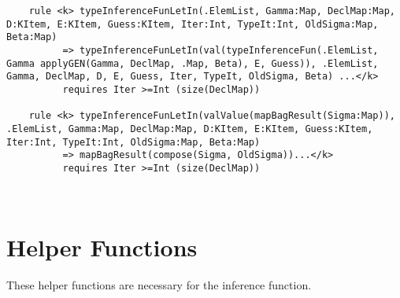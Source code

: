 \begin{lstlisting}
    rule <k> typeInferenceFunLetIn(.ElemList, Gamma:Map, DeclMap:Map, D:KItem, E:KItem, Guess:KItem, Iter:Int, TypeIt:Int, OldSigma:Map, Beta:Map)
          => typeInferenceFunLetIn(val(typeInferenceFun(.ElemList, Gamma applyGEN(Gamma, DeclMap, .Map, Beta), E, Guess)), .ElemList, Gamma, DeclMap, D, E, Guess, Iter, TypeIt, OldSigma, Beta) ...</k>
          requires Iter >=Int (size(DeclMap))

    rule <k> typeInferenceFunLetIn(valValue(mapBagResult(Sigma:Map)), .ElemList, Gamma:Map, DeclMap:Map, D:KItem, E:KItem, Guess:KItem, Iter:Int, TypeIt:Int, OldSigma:Map, Beta:Map)
          => mapBagResult(compose(Sigma, OldSigma))...</k>
          requires Iter >=Int (size(DeclMap))
          
          
\end{lstlisting}
\section{Helper Functions}

These helper functions are necessary for the inference function.

